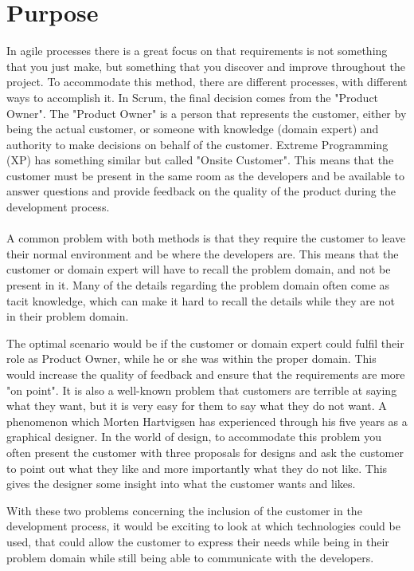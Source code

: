 \section{Purpose}
In agile processes there is a great focus on that requirements is not something that you just make, but something that you discover and improve throughout the project.
To accommodate this method, there are different processes, with different ways to accomplish it. 
In Scrum, the final decision comes from the "Product Owner".
The "Product Owner" is a person that represents the customer, either by being the actual customer, or someone with knowledge (domain expert) and authority to make decisions on behalf of the customer. 
Extreme Programming (XP) has something similar but called "Onsite Customer".
This means that the customer must be present in the same room as the developers and be available to answer questions and provide feedback on the quality of the product during the development process. 
\\\\
A common problem with both methods is that they require the customer to leave their normal environment and be where the developers are. 
This means that the customer or domain expert will have to recall the problem domain, and not be present in it.
Many of the details regarding the problem domain often come as tacit knowledge, which can make it hard to recall the details while they are not in their problem domain. 

The optimal scenario would be if the customer or domain expert could fulfil their role as Product Owner, while he or she was within the proper domain. 
This would increase the quality of feedback and ensure that the requirements are more "on point".
It is also a well-known problem that customers are terrible at saying what they want, but it is very easy for them to say what they do not want.
A phenomenon which Morten Hartvigsen has experienced through his five years as a graphical designer.
In the world of design, to accommodate this problem you often present the customer with three proposals for designs and ask the customer to point out what they like and more importantly what they do not like.
This gives the designer some insight into what the customer wants and likes. 


With these two problems concerning the inclusion of the customer in the development process, it would be exciting to look at which technologies could be used, that could allow the customer to express their needs while being in their problem domain while still being able to communicate with the developers. 

